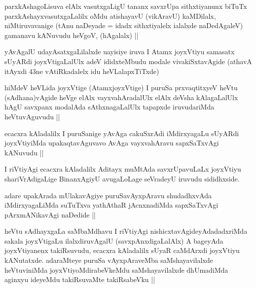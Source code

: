 \begin{artha}
parxkAshagoLisuva elAlx vasutxgaLigU tananx savxrUpa sithxtiyanunx biTuTx parxkAshayxvasutxgaLalilx oMdu atishayavU (vikAravU) kaMDilalx, niMtiruvavanige (tAnu naDeyade =  idadx sithxtiyalelx ialalxde naDedAgaleV) gamanavu kANuvudu heVgoV, (hAgalalx) ||
\end{artha}

\begin{artha}
yAvAgalU udayAsatxgaLilalxde uayisiye iruva I Atamx joyxVtiyu samasatx sUyARdi joyxVtigaLalUlx adeV ididxteMbudu modale vivakiSxtavAgide (athavA itAyxdi 43ne vAtiRkadalelx idu heVLalapxTiTxde)
\end{artha}

\begin{artha}
hiMdeV heVLida joyxVtige (AtamxjoyxVtige) I puruSa prxvaqtitxyeV heVtu (sAdhana)vAgide heVge elAlx vayxvahAradalUlx elAlx deVsha kAlagaLalUlx hAgU savxpanx modalAda sAthxnagaLalUlx tapapxde iruvudariMda heVtuvAguvudu ||
\end{artha}

\begin{artha}
ecacxra kAladalilx I puruSanige yAvAga cakuSxrAdi iMdirxyagaLu sUyARdi joyxVtiyiMda upakaqtavAguvavo AvAga vayxvahAravu sapxSaTxvAgi kANuvudu ||
\end{artha}

\begin{artha}
I riVtiyAgi ecacxra kAladalilx Aditayx muMtAda savxrUpavuLaLx joyxVtiyu shariVrAdigaLige BinanxAgiyU avugaLoLage seVradeyU iruvudu sididhxside.
\end{artha}

\begin{artha}
adare upakArada mUlakavAgiye puruSavAyxpAravu shudadhxvAda iMdirxyagaLiMda suTuTxva yathAthaR jAcnxnadiMda sapxSaTxvAgi pArxmANikavAgi naDedide ||
\end{artha}

\begin{artha}
heVtu sAdhayxgaLa saMbaMdhavu I riVtiyAgi nishicxtavAgideyAdadadxriMda sakala joyxVtigaLu ilalxdiruvAgalU (savxpAnxdigaLalAlx) A bageyAda joyxVtiyanenx takiRsuvudu, ecacxra kAladalilx sUyaR caMdArxdi joyxVtiyu kANutatxde. adaraMteye puruSa vAyxpAraveMba saMshayavilalxde heVtuviniMda joyxVtiyoMdirabeVkeMdu saMshayavilalxde dhUmadiMda aginxyu ideyeMdu takiRsuvaMte takiRsabeVku ||
\end{artha}

